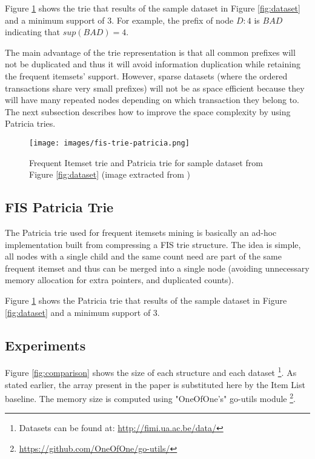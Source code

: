 \documentclass[a4paper,10pt,table,xcdraw]{article}
\begin{document}
Figure \ref{fig:fis-trie} shows the trie that results of the sample dataset in Figure \ref{fig:dataset} and a minimum support of 3. For example, the prefix of node $D:4$ is $BAD$ indicating that $sup(BAD) = 4$.

The main advantage of the trie representation is that all common prefixes will not be duplicated and thus it will avoid information duplication while retaining the frequent itemsets' support. However, sparse datasets (where the ordered transactions share very small prefixes) will not be as space efficient because they will have many repeated nodes depending on which transaction they belong to. The next subsection describes how to improve the space complexity by using Patricia tries.


\begin{figure}[H]
\centering
\texttt{[image: images/fis-trie-patricia.png]}
\caption{Frequent Itemset trie and Patricia trie for sample dataset from Figure \ref{fig:dataset} (image extracted from \cite{Pietracaprina2003}) }
\label{fig:fis-trie}
\end{figure}

\subsection{FIS Patricia Trie}

The Patricia trie used for frequent itemsets mining is basically an ad-hoc implementation built from compressing a FIS trie structure. The idea is simple, all nodes with a single child and the same count need are part of the same frequent itemset and thus can be merged into a single node (avoiding unnecessary memory allocation for extra pointers, and duplicated counts).

Figure \ref{fig:fis-trie} shows the Patricia trie that results of the sample dataset in Figure \ref{fig:dataset} and a minimum support of 3.


\subsection{Experiments}
\label{subsec:fis-comparison}

Figure \ref{fig:comparison} shows the size of each structure and each dataset \footnote{ Datasets can be found at: \url{http://fimi.ua.ac.be/data/}}. As stated earlier, the array present in the paper is substituted here by the Item List baseline. The memory size is computed using "OneOfOne's" go-utils module \footnote{ \url{https://github.com/OneOfOne/go-utils/}}. 
\end{document}
